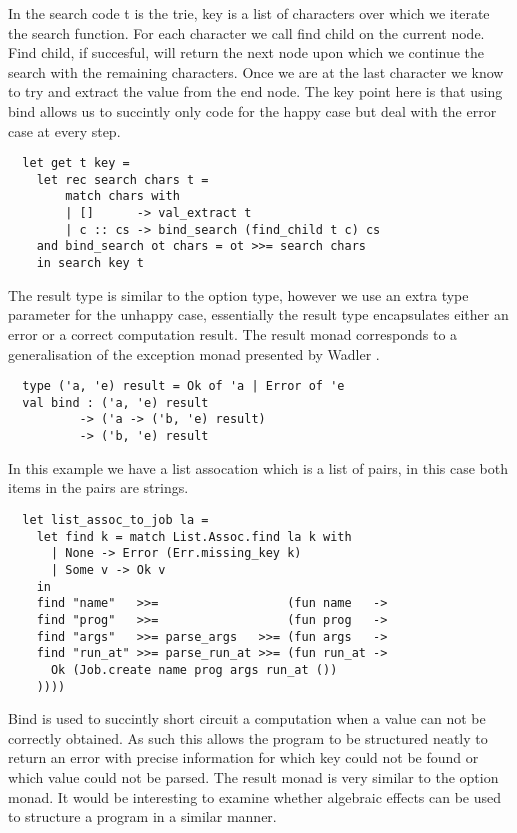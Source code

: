In the search code t is the trie, key is a list of characters over which
we iterate the search function. For each character we call find child on
the current node. Find child, if succesful, will return the next node
upon which we continue the search with the remaining characters. Once we
are at the last character we know to try and extract the value from the end
node. The key point here is that using bind allows us to succintly only code
for the happy case but deal with the error case at every step.

\begin{verbatim}
  let get t key =
    let rec search chars t =
        match chars with
        | []      -> val_extract t
        | c :: cs -> bind_search (find_child t c) cs
    and bind_search ot chars = ot >>= search chars
    in search key t
\end{verbatim}

The result type is similar to the option type, however we use an extra type
parameter for the unhappy case, essentially the result type encapsulates 
either an error or a correct computation result. The result monad
corresponds to a generalisation of the exception monad presented by Wadler \cite{wadler1995monads}.

\begin{verbatim}
  type ('a, 'e) result = Ok of 'a | Error of 'e
  val bind : ('a, 'e) result
          -> ('a -> ('b, 'e) result)
          -> ('b, 'e) result
\end{verbatim}

In this example we have a list assocation which is a list of pairs, in this case both
items in the pairs are strings.

\begin{verbatim}
  let list_assoc_to_job la =
    let find k = match List.Assoc.find la k with
      | None -> Error (Err.missing_key k)
      | Some v -> Ok v
    in
    find "name"   >>=                  (fun name   ->
    find "prog"   >>=                  (fun prog   ->
    find "args"   >>= parse_args   >>= (fun args   ->
    find "run_at" >>= parse_run_at >>= (fun run_at ->
      Ok (Job.create name prog args run_at ())
    ))))
\end{verbatim}

Bind is used to succintly short circuit a computation when a value can not be
correctly obtained. As such this allows the program to be structured neatly to return
an error with precise information for which key could not be found or which value could
not be parsed. The result monad is very similar to the option monad. It would be interesting
to examine whether algebraic effects can be used to structure a program in a similar manner.

